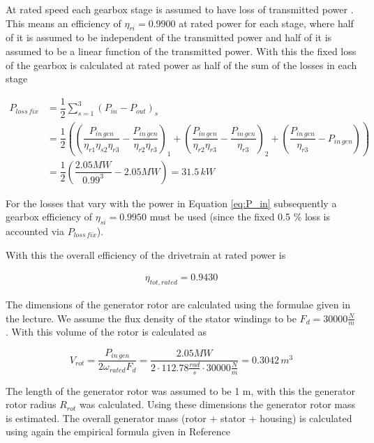 At rated speed each gearbox stage is assumed to have 
loss of transmitted power \cite{hau}. This means an efficiency of $\eta_{ri} = 0.9900$ at rated power for each stage, where half of it is assumed to be independent of the transmitted power and half of it is assumed to be a linear function of the transmitted power. With this the fixed loss of the gearbox is calculated at rated power as half of the sum of the losses in each stage

\begin{align}
    P_{loss\,fix} &= \dfrac{1}{2} \sum \limits_{s = 1}^{3} \left( P_{in} - P_{out}\right)_{s}\\
    &= \dfrac{1}{2} \left( \left( \dfrac{P_{in\,gen}}{\eta_{r1}\eta_{s2} \eta_{r3}} - \dfrac{P_{in\,gen}}{\eta_{r2} \eta_{r3}} \right)_{1} + \left( \dfrac{P_{in\,gen}}{\eta_{r2} \eta_{r3}} - \dfrac{P_{in\,gen}}{\eta_{r3}}\right)_{2}+ \left( \dfrac{P_{in\,gen}}{\eta_{r3}} - P_{in\,gen} \right) \right)\\
    &= \dfrac{1}{2} \left( \dfrac{2.05 MW}{0.99^3} - 2.05 MW \right) = 31.5 \,kW
\label{eq:Ploss_fix}
\end{align}

For the losses that vary with the power in Equation \ref{eq:P_in} subsequently a gearbox efficiency of $\eta_{si} = 0.9950$ must be used (since the fixed 0.5 \% loss is accounted via $P_{loss \, fix}$).

\newpage
With this the overall efficiency of the drivetrain at rated power is

\begin{align}
\eta_{tot, rated} = 0.9430    
\end{align}

The dimensions of the generator rotor are calculated using the formulae given in the lecture. We assume the flux density of the stator windings to be $F_d = 30000 \frac{N}{m}$. With this volume of the rotor is calculated as

\begin{equation}
    V_{rot} = \dfrac{P_{in \, gen}}{2 \omega_{rated} F_d} = \dfrac{2.05 MW}{2 \cdot 112.78 \frac{rad}{s} \cdot 30000 \frac{N}{m}} = 0.3042 \,m^3
\end{equation}

The length of the generator rotor was assumed to be 1 m, with this the generator rotor radius $R_{rot}$ was calculated. Using these dimensions the generator rotor mass is estimated. The overall generator mass (rotor + stator + housing) is calculated using again the empirical formula given in Reference~\cite{Fingersh2006}

